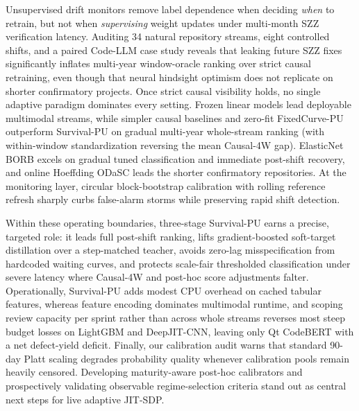 \documentclass[pdflatex,sn-basic]{sn-jnl}
\theoremstyle{definition}
\theoremstyle{plain}
\begin{document}
Unsupervised drift monitors remove label dependence when deciding \textit{when} to retrain, but not when \textit{supervising} weight updates under multi-month SZZ verification latency. Auditing 34 natural repository streams, eight controlled shifts, and a paired Code-LLM case study reveals that leaking future SZZ fixes significantly inflates multi-year window-oracle ranking over strict causal retraining, even though that neural hindsight optimism does not replicate on shorter confirmatory projects. Once strict causal visibility holds, no single adaptive paradigm dominates every setting. Frozen linear models lead deployable multimodal streams, while simpler causal baselines and zero-fit FixedCurve-PU outperform Survival-PU on gradual multi-year whole-stream ranking (with within-window standardization reversing the mean Causal-4W gap). ElasticNet BORB excels on gradual tuned classification and immediate post-shift recovery, and online Hoeffding ODaSC leads the shorter confirmatory repositories. At the monitoring layer, circular block-bootstrap calibration with rolling reference refresh sharply curbs false-alarm storms while preserving rapid shift detection.

Within these operating boundaries, three-stage Survival-PU earns a precise, targeted role: it leads full post-shift ranking, lifts gradient-boosted soft-target distillation over a step-matched teacher, avoids zero-lag misspecification from hardcoded waiting curves, and protects scale-fair thresholded classification under severe latency where Causal-4W and post-hoc score adjustments falter. Operationally, Survival-PU adds modest CPU overhead on cached tabular features, whereas feature encoding dominates multimodal runtime, and scoping review capacity per sprint rather than across whole streams reverses most steep budget losses on LightGBM and DeepJIT-CNN, leaving only Qt CodeBERT with a net defect-yield deficit. Finally, our calibration audit warns that standard 90-day Platt scaling degrades probability quality whenever calibration pools remain heavily censored. Developing maturity-aware post-hoc calibrators and prospectively validating observable regime-selection criteria stand out as central next steps for live adaptive JIT-SDP.

\backmatter

\end{document}

